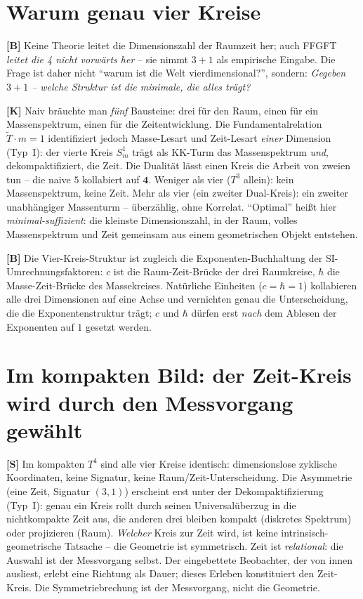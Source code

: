 \section{Warum genau vier Kreise}

\textbf{[B]} Keine Theorie leitet die Dimensionszahl der Raumzeit her; auch FFGFT
\emph{leitet die 4 nicht vorwärts her} -- sie nimmt $3+1$ als empirische Eingabe.
Die Frage ist daher nicht \enquote{warum ist die Welt vierdimensional?}, sondern:
\emph{Gegeben $3+1$ -- welche Struktur ist die minimale, die alles trägt?}

\textbf{[K]} Naiv bräuchte man \emph{fünf} Bausteine: drei für den Raum, einen
für ein Massenspektrum, einen für die Zeitentwicklung. Die Fundamentalrelation
$\tilde T\cdot m=1$ identifiziert jedoch Masse-Lesart und Zeit-Lesart \emph{einer}
Dimension (Typ~I): der vierte Kreis $S^1_m$ trägt als KK-Turm das Massenspektrum
\emph{und}, dekompaktifiziert, die Zeit. Die Dualität lässt einen Kreis die Arbeit
von zweien tun -- die naive $5$ kollabiert auf $\mathbf{4}$. Weniger als vier
($T^3$ allein): kein Massenspektrum, keine Zeit. Mehr als vier (ein zweiter
Dual-Kreis): ein zweiter unabhängiger Massenturm -- überzählig, ohne Korrelat.
\enquote{Optimal} heißt hier \emph{minimal-suffizient}: die kleinste
Dimensionszahl, in der Raum, volles Massenspektrum und Zeit gemeinsam aus einem
geometrischen Objekt entstehen.

\textbf{[B]} Die Vier-Kreis-Struktur ist zugleich die Exponenten-Buchhaltung der
SI-Umrechnungsfaktoren: $c$ ist die Raum-Zeit-Brücke der drei Raumkreise, $\hbar$
die Masse-Zeit-Brücke des Massekreises. Natürliche Einheiten ($c=\hbar=1$)
kollabieren alle drei Dimensionen auf eine Achse und vernichten genau die
Unterscheidung, die die Exponentenstruktur trägt; $c$ und $\hbar$ dürfen erst
\emph{nach} dem Ablesen der Exponenten auf $1$ gesetzt werden.

\section{Im kompakten Bild: der Zeit-Kreis wird durch den Messvorgang gewählt}

\textbf{[S]} Im kompakten $T^4$ sind alle vier Kreise identisch: dimensionslose
zyklische Koordinaten, keine Signatur, keine Raum/Zeit-Unterscheidung. Die
Asymmetrie (eine Zeit, Signatur $(3,1)$) erscheint erst unter der
Dekompaktifizierung (Typ~I): genau ein Kreis rollt durch seinen Universalüberzug in
die nichtkompakte Zeit aus, die anderen drei bleiben kompakt (diskretes Spektrum)
oder projizieren (Raum). \emph{Welcher} Kreis zur Zeit wird, ist keine
intrinsisch-geometrische Tatsache -- die Geometrie ist symmetrisch. Zeit ist
\emph{relational}: die Auswahl ist der Messvorgang selbst. Der eingebettete
Beobachter, der von innen ausliest, erlebt eine Richtung als Dauer;
dieses Erleben konstituiert den Zeit-Kreis. Die Symmetriebrechung ist der
Messvorgang, nicht die Geometrie.

